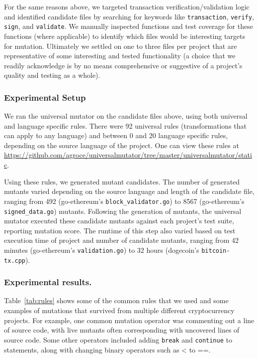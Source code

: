 For the same reasons above, we targeted transaction verification/validation logic and
identified candidate files by searching for keywords like \texttt{transaction},
\texttt{verify}, \texttt{sign}, and \texttt{validate}. We manually inspected
functions and test coverage for these functions (where applicable) to identify
which files would be interesting targets for mutation. Ultimately we
settled on one to three files per project that are representative of some
interesting and tested functionality (a choice that we readily acknowledge is by
no means comprehensive or suggestive of a project's quality and testing as a
whole).

\subsubsection*{Experimental Setup}
We ran the universal mutator on the candidate files above, using both universal and
language specific rules. There were 92 universal rules (transformations that can apply to
any language) and between 0 and 20 language specific rules, depending on the source language
of the project. One can view these rules
at \url{https://github.com/agroce/universalmutator/tree/master/universalmutator/static}.

Using these rules, we generated mutant candidates. The number of generated mutants varied depending
on the source language and length of the candidate file, ranging from
492 (go-ethereum's {\tt block\_validator.go}) to
8567 (go-ethereum's {\tt signed\_data.go}) mutants. Following the generation of mutants, the universal mutator
executed these candidate mutants against each project's test suite, reporting mutation score. The runtime
of this step also varied based on test execution time of project and number of candidate mutants, ranging from
42 minutes (go-ethereum's {\tt validation.go}) to 32 hours (dogecoin's
{\tt bitcoin-tx.cpp}).

\subsubsection*{Experimental results.}

Table~\ref{tab:rules} shows some of the common rules that we used and some examples of mutations that survived
from multiple different cryptocurrency projects. For example, one common mutation operator was commenting out a line
of source code, with live mutants often corresponding with uncovered lines of source code. Some other operators
included adding {\tt break} and {\tt continue} to statements, along with changing binary operators such as < to ==.

